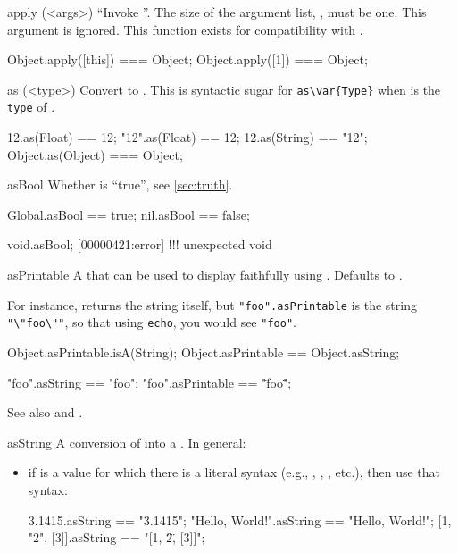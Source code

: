 \begin{urbiscriptapi}
\item[apply](<args>)%
  ``Invoke \this''.  The size of the argument list,
  , must be one.  This argument is ignored.  This function
  exists for compatibility with .
\begin{urbiassert}
Object.apply([this]) === Object;
Object.apply([1])    === Object;
\end{urbiassert}


\item[as](<type>)%
  Convert \this to .  This is syntactic sugar for
  \lstinline|as\var{Type}| when  is the \lstinline|type| of
  .
\begin{urbiassert}
     12.as(Float) == 12;
   "12".as(Float) == 12;
    12.as(String) == "12";
Object.as(Object) === Object;
\end{urbiassert}


\item[asBool]
  Whether \this is ``true'', see \autoref{sec:truth}.
\begin{urbiassert}
Global.asBool == true;
nil.asBool ==    false;
\end{urbiassert}

\begin{urbiscript}
void.asBool;
[00000421:error] !!! unexpected void
\end{urbiscript}


\item[asPrintable]%
  A  that can be used to display faithfully \this using
  .  Defaults to .

  For instance,  returns the string itself, but
  \lstinline{"foo".asPrintable} is the string \lstinline{"\"foo\""}, so that
  using \lstinline{echo}, you would see \lstinline{"foo"}.
\begin{urbiassert}
Object.asPrintable.isA(String);
Object.asPrintable == Object.asString;

"foo".asString == "foo";
"foo".asPrintable == "\"foo\"";
\end{urbiassert}

  See also  and .


\item[asString]%
  A conversion of \this into a .  In general:
  \begin{itemize}
  \item if \this is a value for which there is a literal syntax (e.g.,
    , , , etc.), then use
    that syntax:
\begin{urbiassert}
         3.1415.asString == "3.1415";
"Hello, World!".asString == "Hello, World!";
  [1, "2", [3]].asString == "[1, \"2\", [3]]";
\end{urbiassert}


\end{itemize}
\end{urbiscriptapi}
